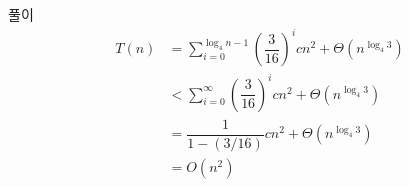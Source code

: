\documentclass[10pt]{beamer}
\begin{document}
\begin{frame}[fragile]{풀이}
    \[
        \begin{aligned}
            T(n) &= \sum_{i=0}^{\log_4 n-1} \left( \dfrac{3}{16} \right)  ^i cn^2 + \Theta(n^{\log_4 3}) \\
            &<  \sum_{i=0}^{\infty} \left( \dfrac{3}{16} \right)^i cn^2 + \Theta(n^{\log_4 3}) \\
            &= \dfrac{1}{1-(3/16)}cn^2 + \Theta(n^{\log_4 3})\\
            &= O(n^2)
        \end{aligned}
    \]
\end{frame}
\end{document}
